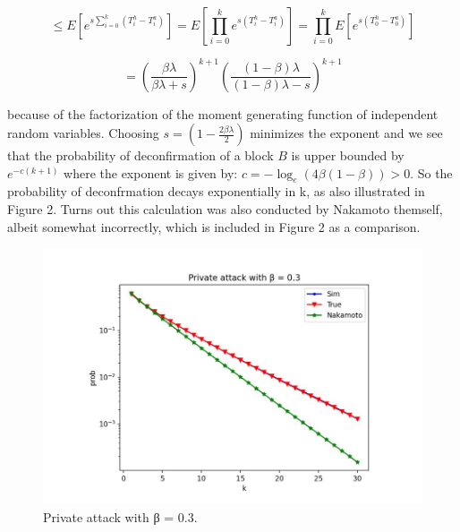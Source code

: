 \documentclass{report}
\begin{document}
\begin{equation}
	\leq E[e^{s\sum_{i=0}^{k}(T_{i}^{h} - T_{i}^{a})}] = E[\prod_{i=0}^{k}e^{s(T_{i}^{h} - T_{i}^{a})}] = \prod_{i=0}^{k}E[e^{s(T_{0}^{h} - T_{0}^{a})}]
\end{equation}

\begin{equation}
	 = (\frac{\beta\lambda}{\beta \lambda + s})^{k + 1} (\frac{(1 - \beta) \lambda}{(1 - \beta) \lambda - s})^{k + 1}
\end{equation}

because of the factorization of the moment generating function of independent random variables. Choosing $s = (1−\frac{2\beta\lambda}{2})$ minimizes the exponent and we see that the probability of deconfirmation of a block $B$ is upper bounded by $e^{−c(k+1)}$ where the exponent is given by:
$c = − \log_{e}(4\beta(1 - \beta)) > 0.$
So the probability of deconfrmation decays exponentially in k, as also illustrated in Figure 2. Turns out this calculation was also conducted by Nakamoto themself, albeit somewhat incorrectly, which is included in Figure 2 as a comparison.
\begin{figure}[h!]
	\centering
	\includegraphics[width=0.6\linewidth]{Fig/F2}
	\caption{Private attack with β = 0.3.}
	\label{fig:f1}
\end{figure}
\end{document}
